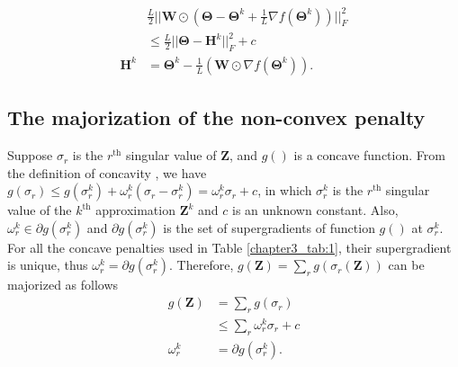 \begin{equation}\label{chapter3_eq:4}
\begin{aligned}
              &\frac{L}{2} ||\mathbf{W} \odot(\mathbf{\Theta} - \mathbf{\Theta}^k + \frac{1}{L} \nabla f(\mathbf{\Theta}^k))||_F^2 \\
             &\leq  \frac{L}{2} ||\mathbf{\Theta}-\mathbf{H}^k||_F^2 + c \\
              \mathbf{H}^k &= \mathbf{\Theta}^k - \frac{1}{L} (\mathbf{W}\odot \nabla f(\mathbf{\Theta}^k)).
\end{aligned}
\end{equation}

\subsection{The majorization of the non-convex penalty}
Suppose $\sigma_r$ is the $r^{\text{th}}$ singular value of $\mathbf{Z}$, and $g()$ is a concave function. From the definition of concavity \cite{boyd2004convex}, we have $g(\sigma_r) \leq g(\sigma_r^k) + \omega_r^k(\sigma_r - \sigma_r^k) = \omega_r^k \sigma_r + c$, in which $\sigma_r^k$ is the $r^{\text{th}}$ singular value of the $k^{\text{th}}$ approximation $\mathbf{Z}^k$ and $c$ is an unknown constant. Also, $\omega_r^k \in \partial g(\sigma_r^k)$ and $\partial g(\sigma_r^k)$ is the set of supergradients of function $g()$ at $\sigma_r^k$. For all the concave penalties used in Table \ref{chapter3_tab:1}, their supergradient is unique, thus $\omega_r^k = \partial g(\sigma_r^k)$. Therefore, $g(\mathbf{Z})= \sum_{r}g(\sigma_r(\mathbf{Z}))$ can be majorized as follows
\begin{equation}\label{chapter3_eq:5}
\begin{aligned}
g(\mathbf{Z}) &= \sum_{r}g(\sigma_r)\\
              &\leq \sum_{r}\omega_{r}^k \sigma_r + c\\
       \omega_r^k &= \partial g(\sigma_r^k).
\end{aligned}
\end{equation}


